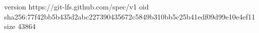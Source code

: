 version https://git-lfs.github.com/spec/v1
oid sha256:77f42bb5b435d2abc227390435672c5849b310bb5c25b41edf09d99e10e4ef11
size 43864

